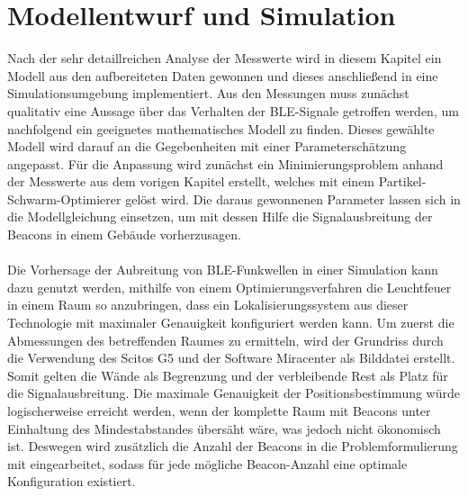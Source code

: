 \chapter{Modellentwurf und Simulation}
Nach der sehr detaillreichen Analyse der Messwerte wird in diesem Kapitel ein Modell aus den aufbereiteten Daten gewonnen und dieses anschließend in eine Simulationsumgebung implementiert. Aus den Messungen muss zunächst qualitativ eine Aussage über das Verhalten der BLE-Signale getroffen werden, um nachfolgend ein geeignetes mathematisches Modell zu finden. Dieses gewählte Modell wird darauf an die Gegebenheiten mit einer Parameterschätzung angepasst. Für die Anpassung wird zunächst ein Minimierungsproblem anhand der Messwerte aus dem vorigen Kapitel erstellt, welches mit einem Partikel-Schwarm-Optimierer gelöst wird. Die daraus gewonnenen Parameter lassen sich in die Modellgleichung einsetzen, um mit dessen Hilfe die Signalausbreitung der Beacons in einem Gebäude vorherzusagen. \\ \\
Die Vorhersage der Aubreitung von BLE-Funkwellen in einer Simulation kann dazu genutzt werden, mithilfe von einem Optimierungsverfahren die Leuchtfeuer in einem Raum so anzubringen, dass ein Lokalisierungssystem aus dieser Technologie mit maximaler Genauigkeit konfiguriert werden kann. Um zuerst die Abmessungen des betreffenden Raumes zu ermitteln, wird der Grundriss durch die Verwendung des Scitos G5 und der Software Miracenter als Bilddatei erstellt. Somit gelten die Wände als Begrenzung und der verbleibende Rest als Platz für die Signalausbreitung. Die maximale Genauigkeit der Positionsbestimmung würde logischerweise erreicht werden, wenn der komplette Raum mit Beacons unter Einhaltung des Mindestabstandes übersäht wäre, was jedoch nicht ökonomisch ist. Deswegen wird zusätzlich die Anzahl der Beacons in die Problemformulierung mit eingearbeitet, sodass für jede mögliche Beacon-Anzahl eine optimale Konfiguration existiert. 
